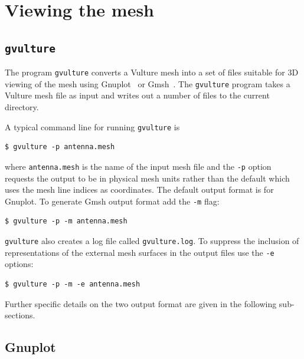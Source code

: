 \documentclass[onecolumn,a4paper]{article}
\numberwithin{equation}{section}
\begin{document}
%
%
\section{Viewing the mesh}
%
%

\subsection{\texttt{gvulture}}

The program \texttt{gvulture} converts a Vulture mesh into a set of files suitable for 
3D viewing of the mesh using Gnuplot~\cite{gnuplotweb} or Gmsh~\cite{gmshweb}. The 
\texttt{gvulture} program  takes a Vulture mesh file as input and writes out a number
of files to the current directory.

A typical command line for running \texttt{gvulture} is
\begin{verbatim}
$ gvulture -p antenna.mesh
\end{verbatim}
where \texttt{antenna.mesh} is the name of the input mesh file and the \texttt{-p} option 
requests the output to be in physical mesh units rather than the default which uses the
mesh line indices as coordinates. The default output format is for Gnuplot. To generate Gmsh
output format add the \texttt{-m} flag:
\begin{verbatim}
$ gvulture -p -m antenna.mesh
\end{verbatim}
\texttt{gvulture} also creates a log file called \texttt{gvulture.log}.
To suppress the inclusion of representations of the external mesh surfaces in the 
output files use the \texttt{-e} options:
\begin{verbatim}
$ gvulture -p -m -e antenna.mesh
\end{verbatim}
Further specific details on the two output format are given in the following sub-sections.


\subsection{Gnuplot}
\end{document}
